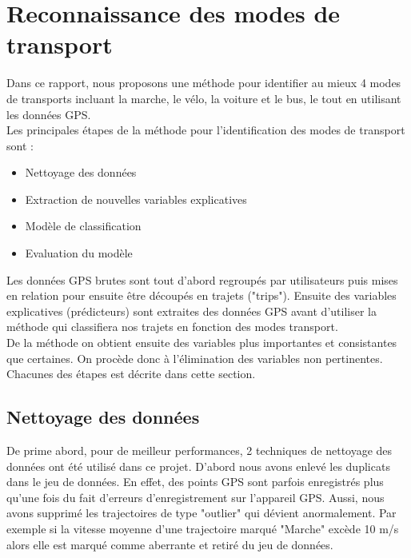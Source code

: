 \documentclass{article}
\begin{document}
\newpage

\section{Reconnaissance des modes de transport}

Dans ce rapport, nous proposons une méthode pour identifier au mieux 4 modes de transports incluant la marche, le vélo, la voiture et le bus, le tout en utilisant les données GPS.\\

Les principales étapes de la méthode pour l'identification des modes de transport sont :
\begin{itemize}
    \item Nettoyage des données
    \item Extraction de nouvelles variables explicatives
    \item Modèle de classification 
    \item Evaluation du modèle\\
\end{itemize}

Les données GPS brutes sont tout d'abord regroupés par utilisateurs puis mises en relation pour ensuite être découpés en trajets ("trips"). Ensuite des variables explicatives (prédicteurs) sont extraites des données GPS avant d'utiliser la méthode qui classifiera nos trajets en fonction des modes transport.\\

De la méthode on obtient ensuite des variables plus importantes et consistantes que certaines. On procède donc à l'élimination des variables non pertinentes.\\

Chacunes des étapes est décrite dans cette section.

\subsection{Nettoyage des données}


De prime abord, pour de meilleur performances, 2 techniques de nettoyage des données ont été utilisé dans ce projet. 
D'abord nous avons enlevé les duplicats dans le jeu de données. En effet, des points GPS sont parfois enregistrés plus qu'une fois du fait d'erreurs d'enregistrement sur l'appareil GPS. 
Aussi, nous avons supprimé les trajectoires de type "outlier" qui dévient anormalement.
Par exemple si la vitesse moyenne d'une trajectoire marqué "Marche" excède 10 m/s alors elle est marqué comme aberrante et retiré du jeu de données.\\
\end{document}
